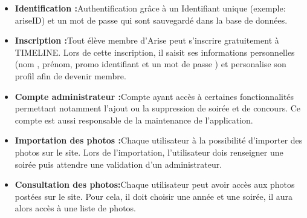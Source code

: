 \documentclass[11pt]{article} %
\begin{document}
\begin {itemize}
\item \textbf{Identification :}Authentification grâce à un Identifiant unique (exemple: ariseID) et un mot de passe qui sont sauvegardé dans la base de données.

\item \textbf{Inscription :}Tout élève membre d'Arise peut s’inscrire gratuitement à TIMELINE.
Lors de cette inscription, il saisit ses informations personnelles (nom , prénom, promo  identifiant et un mot de passe ) et personalise son profil afin de devenir membre.

\item \textbf{Compte administrateur :}Compte ayant accès à certaines fonctionnalités permettant notamment l’ajout ou la suppression de soirée et de concours. Ce compte est aussi responsable de la maintenance de l’application.

\item \textbf{Importation des photos :}Chaque utilisateur à la possibilité d’importer des photos sur le site. Lors de l’importation, l’utilisateur dois renseigner une soirée puis attendre une validation d'un administrateur.

\item \textbf{Consultation des photos:}Chaque utilisateur peut avoir accès aux photos postées sur le site. Pour cela, il doit choisir une année et une soirée, il aura alors accès à une liste de photos.

\end{itemize}

\newpage
\end{document}
